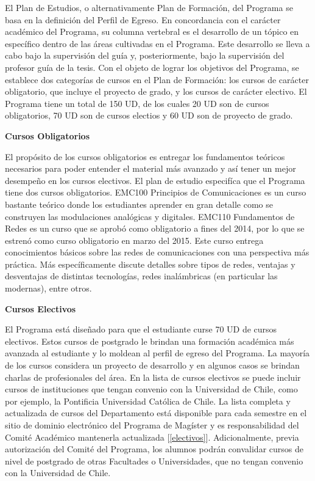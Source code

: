El Plan de Estudios, o alternativamente Plan de Formación, del Programa se basa en la definición
del Perfil de Egreso. En concordancia con el carácter académico del Programa, su columna
vertebral es el desarrollo de un tópico en específico dentro de las áreas cultivadas
en el Programa. Este desarrollo se lleva a cabo bajo la supervisión del guía y, posteriormente,
bajo la supervisión del profesor guía de la tesis. Con el objeto de lograr los objetivos del Programa,
se establece dos categorías de cursos en el Plan de Formación: los cursos de carácter obligatorio, que 
incluye el proyecto de grado, y los cursos de carácter electivo. El Programa tiene un total de 150 UD,
de los cuales 20 UD son de cursos obligatorios, 70 UD son de cursos electios y 60 UD son de proyecto de grado.

\noindent\textbf{Cursos Obligatorios}

El propósito de los cursos obligatorios es entregar los fundamentos teóricos necesarios para poder
entender el material más avanzado y así tener un mejor desempeño en los cursos electivos. El plan de 
estudio especifíca que el Programa tiene dos cursos obligatorios. EMC100 Principios de Comunicaciones es un 
curso bastante teórico donde los estudiantes aprender en gran detalle como se construyen las modulaciones 
analógicas y digitales. EMC110 Fundamentos de Redes es un curso que se aprobó como obligatorio a fines del 2014,
por lo que se estrenó como curso obligatorio en marzo del 2015. Este curso entrega conocimientos básicos sobre
las redes de comunicaciones con una perspectiva más práctica. Más específicamente discute detalles sobre tipos
de redes, ventajas y desventajas de distintas tecnologías, redes inalámbricas (en particular las modernas), entre otros.

\noindent\textbf{Cursos Electivos}

El Programa está diseñado para que el estudiante curse 70 UD de cursos
electivos. Estos cursos de postgrado le brindan una formación académica más avanzada al estudiante y lo 
moldean al perfil de egreso del Programa. La mayoría de los cursos considera un proyecto de desarrollo y 
en algunos casos se brindan charlas de profesionales del área. En la lista de cursos electivos se puede
incluir cursos de instituciones que tengan convenio con la Universidad de Chile, como por ejemplo, la Pontificia
Universidad Católica de Chile.
La lista completa y actualizada de cursos del Departamento está disponible
para cada semestre en el sitio de dominio electrónico del Programa de Magíster y es responsabilidad
del Comité Académico mantenerla actualizada [\ref{electivos}].
Adicionalmente, previa autorización del Comité del Programa, los alumnos podrán convalidar
cursos de nivel de postgrado de otras Facultades o Universidades, que no tengan convenio con la Universidad de Chile.

